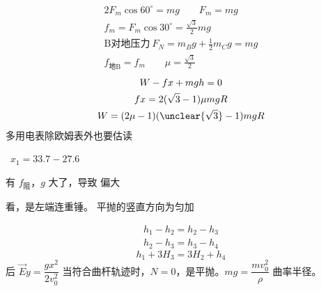 \begin{gather*}
2F_m\cos60^\circ=mg\qquad F_m=mg\\
f_m=F_m\cos30^\circ=\frac{\sqrt{3}}{2}mg\\
\text{B对地压力}\ F_N=m_Bg+\tfrac12 m_Cg=mg\\
f_{\text{地B}}=f_m\qquad \mu=\frac{\sqrt{3}}{2}
\end{gather*}
\begin{gather*}
W-fx+mgh=0\\
fx=2(\sqrt{3}-1)\mu mgR\\
W=(2\mu-1)(\unclear{\sqrt{3}}-1)mgR
\end{gather*}
多用电表除欧姆表外也要估读

\ $x_1=33.7-27.6$

有 $f_{\text{阻}}$，$g$ 大了，导致  偏大%

看，是左端连重锤。
平抛的竖直方向为匀加


\begin{gather*}
h_1-h_2=h_2-h_3\\
h_2-h_3=h_3-h_4
\end{gather*}
\[ h_1+3H_3=3H_2+h_4 \]%
后 $\vec{E}$\quad $y=\dfrac{gx^2}{2v_0^2}$ 当符合曲杆轨迹时，$N=0$，是平抛。$mg=\dfrac{mv_0^2}{\rho}$ 曲率半径。
